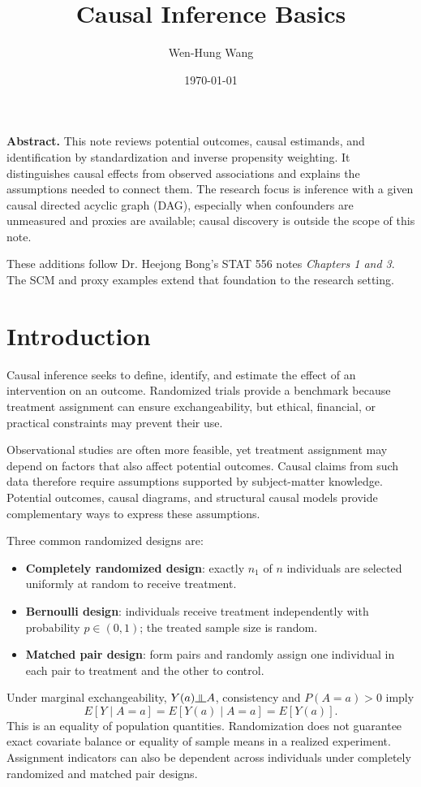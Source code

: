 \documentclass[11pt,twoside]{article}
\title{Causal Inference Basics}
\author{Wen-Hung Wang}
\date{\today}
\begin{document}
\maketitle
\textbf{Abstract.} This note reviews potential outcomes, causal estimands, and identification by standardization and inverse propensity weighting. It distinguishes causal effects from observed associations and explains the assumptions needed to connect them. The research focus is inference with a given causal directed acyclic graph (DAG), especially when confounders are unmeasured and proxies are available; causal discovery is outside the scope of this note.

{\small These additions follow Dr. Heejong Bong's STAT 556 notes \emph{Chapters 1 and 3}. The SCM and proxy examples extend that foundation to the research setting.}

\tableofcontents
\bigskip
\section{Introduction}
Causal inference seeks to define, identify, and estimate the effect of an intervention on an outcome. Randomized trials provide a benchmark because treatment assignment can ensure exchangeability, but ethical, financial, or practical constraints may prevent their use. 

Observational studies are often more feasible, yet treatment assignment may depend on factors that also affect potential outcomes. Causal claims from such data therefore require assumptions supported by subject-matter knowledge. Potential outcomes, causal diagrams, and structural causal models provide complementary ways to express these assumptions.

Three common randomized designs are:
\begin{itemize}
    \item \textbf{Completely randomized design}: exactly $n_1$ of $n$ individuals are selected uniformly at random to receive treatment.
    \item \textbf{Bernoulli design}: individuals receive treatment independently with probability $p\in(0,1)$; the treated sample size is random.
    \item \textbf{Matched pair design}: form pairs and randomly assign one individual in each pair to treatment and the other to control.
\end{itemize}


Under marginal exchangeability, $Y(a)\indep A$, consistency and $P(A=a)>0$ imply
\[
 E[Y\mid A=a]=E[Y(a)\mid A=a]=E[Y(a)].
\]
This is an equality of population quantities. Randomization does not guarantee exact covariate balance or equality of sample means in a realized experiment. Assignment indicators can also be dependent across individuals under completely randomized and matched pair designs.
\end{document}
